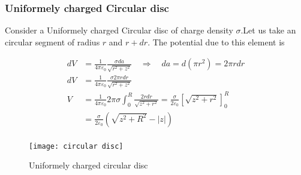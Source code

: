 \subsubsection{Uniformely charged  Circular disc}

Consider a Uniformely charged  Circular disc of charge density $\sigma$.Let us take an circular segment of radius $r$ and $r+d r$. The potential due to this element is\\
\begin{minipage}{0.65\textwidth}
\begin{align*}
d V&=\frac{1}{4 \pi \varepsilon_{0}} \frac{\sigma da}{\sqrt{r^{2}+z^{2}}} \quad \Longrightarrow \quad da=d(\pi r^{2})=2\pi r dr \\
d V&=\frac{1}{4 \pi \varepsilon_{0}} \frac{ \sigma 2 \pi r d r }{\sqrt{r^{2}+z^{2}}} \\
V&=\frac{1}{4 \pi \varepsilon_{0}} 2 \pi \sigma \int_{0}^{R} \frac{2 r d r}{\sqrt{z^{2}+r^{2}}}=\frac{\sigma}{2 \varepsilon_{0}}\left[\sqrt{z^{2}+r^{2}}\right]_{0}^{R} \\
&=\frac{\sigma}{2 \varepsilon_{0}}\left(\sqrt{z^{2}+R^{2}}-|z|\right)\\
\end{align*}
\end{minipage}
\begin{minipage}{0.35\textwidth}
	\begin{figure}[H]
		\centering
	\texttt{[image: circular disc]}
		\caption{Uniformely charged circular disc}
		\label{charged circular disc}
	\end{figure}
	
\end{minipage}


